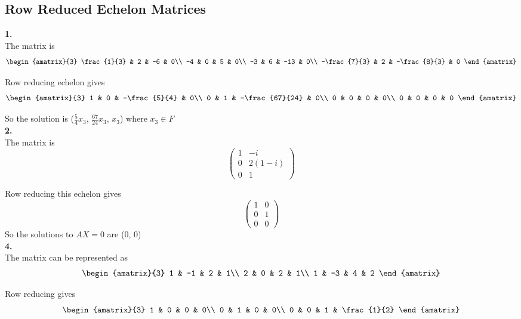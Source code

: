 \documentclass[11pt]{article}
\begin{document}
\subsection{Row Reduced Echelon Matrices}
\textbf{1.}\\

The matrix is
\[
  \begin{amatrix}{3}
    \frac{1}{3} & 2 & -6 & 0\\
    -4 & 0 & 5 & 0\\
    -3 & 6 & -13 & 0\\
    -\frac{7}{3} & 2 & -\frac{8}{3} & 0
  \end{amatrix}
\]

Row reducing echelon gives
\[
  \begin{amatrix}{3}
    1 & 0 & -\frac{5}{4} & 0\\
    0 & 1 & -\frac{67}{24} & 0\\
    0 & 0 & 0 & 0\\
    0 & 0 &  0 & 0
  \end{amatrix}
\]

So the solution is ($\frac{5}{4}x_3$, $\frac{67}{24}x_3$, $x_3$) where $x_3 \in F$\\

\textbf{2.}\\

The matrix is
\[
  \begin{pmatrix}
    1 & -i\\
    0 & 2(1 - i)\\
    0 & 1
  \end{pmatrix}
\]

Row reducing this echelon gives
\[
  \begin{pmatrix}
    1 & 0\\
    0 & 1\\
    0 & 0
  \end{pmatrix}
\]
So the solutions to $AX = 0$ are ($0$, $0$)\\

\textbf{4.}\\

The matrix can be represented as
\[
  \begin{amatrix}{3}
  1 & -1 & 2 & 1\\
  2 & 0 & 2 & 1\\
  1 & -3 & 4 & 2
  \end{amatrix}
\]

Row reducing gives
\[
  \begin{amatrix}{3}
    1 & 0 & 0 & 0\\
    0 & 1 & 0 & 0\\
    0 & 0 & 1 & \frac{1}{2} 
  \end{amatrix}
\]
\end{document}
